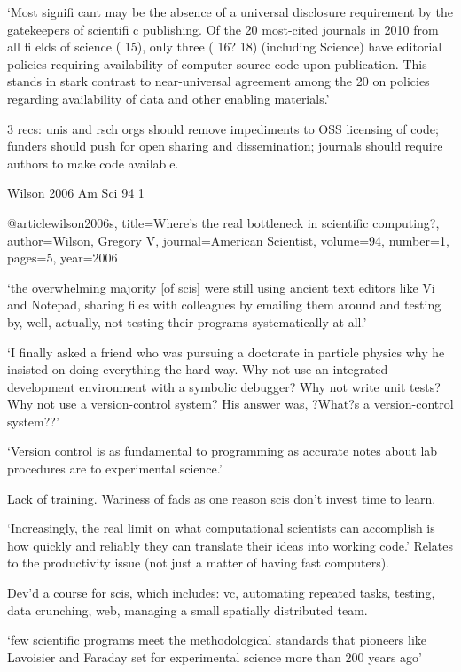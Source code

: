 \documentclass[12pt]{amsart}
\begin{document}
`Most signifi cant may be the absence of a universal disclosure requirement by the gatekeepers of scientifi c publishing. Of the 20  most-cited  journals  in  2010  from  all  fi elds of science ( 15), only three ( 16? 18) (including Science) have editorial policies requiring  availability  of  computer  source  code upon publication. This stands in stark contrast to near-universal agreement among the 20 on policies regarding availability of data and other enabling materials.'

3 recs: unis and rsch orgs should remove impediments to OSS licensing of code; funders should push for open sharing and dissemination; journals should require authors to make code available.


Wilson 2006 Am Sci 94 1 

@article{wilson2006s,
  title={Where's the real bottleneck in scientific computing?},
  author={Wilson, Gregory V},
  journal={American Scientist},
  volume={94},
  number={1},
  pages={5},
  year={2006}
}

`the overwhelming majority [of scis] were still using ancient text editors like Vi and Notepad, sharing files with colleagues by emailing them around and testing by, well, actually, not testing their programs systematically at all.'

`I finally asked a friend who was pursuing a doctorate in particle physics why he insisted on doing everything the hard way. Why not use an integrated development environment with a symbolic debugger? Why not write unit tests? Why not use a version-control system? His answer was, ?What?s a version-control system??'

`Version control is as fundamental to programming as accurate notes about lab procedures are to experimental science.'

Lack of training. Wariness of fads as one reason scis don't invest time to learn. 

`Increasingly, the real limit on what computational scientists can accomplish is how quickly and reliably they can translate their ideas into working code.' Relates to the productivity issue (not just a matter of having fast computers).

Dev'd a course for scis, which includes: vc, automating repeated tasks, testing, data crunching, web, managing a small spatially distributed team.

`few scientific programs meet the methodological standards that pioneers like Lavoisier and Faraday set for experimental science more than 200 years ago'
\end{document}

